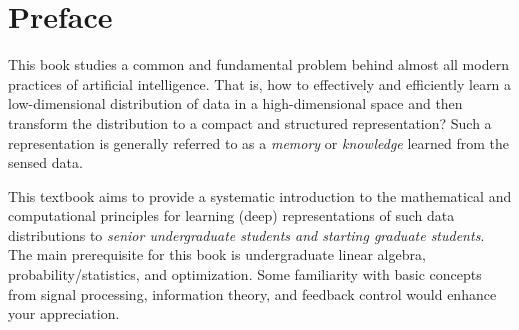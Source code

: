 \documentclass[../../book-main.tex]{subfiles}
\begin{document}
\chapter*{Preface}

This book studies a common and fundamental problem behind almost all modern practices of artificial intelligence. That is, how to effectively and efficiently learn a low-dimensional distribution of data in a high-dimensional space and then transform the distribution to a compact and structured representation? Such a representation is  generally referred to as a {\em memory} or {\em knowledge} learned from the sensed data. 

This textbook aims to provide a systematic introduction to the mathematical and computational principles for learning (deep) representations of such data distributions to {\em senior undergraduate students and starting graduate students}. The main prerequisite for this book is undergraduate linear algebra, probability/statistics, and optimization. Some familiarity with basic concepts from signal processing, information theory, and feedback control would enhance your appreciation. 
\end{document}
